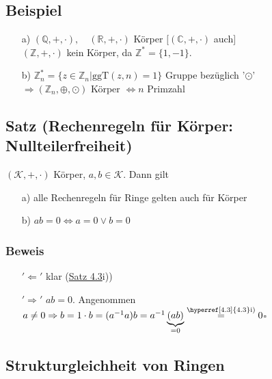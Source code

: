 \documentclass[12pt,titlepage, pdf]{article}
\newcommand{\qed}{\hfill$\square$}
\renewcommand{\>}{\rightarrow}
\renewcommand{\*}{\cdot}
\begin{document}
	      \subsection{Beispiel}
	      \begin{itemize}
	      	\item[a)] $(\mathds{Q},+,\cdot),\quad (\mathds{R},+,\cdot)$ Körper $[(\mathds{C},+,\cdot)$ auch] \\
	      	      $(\mathds{Z},+,\cdot)$ kein Körper, da $\mathds{Z}^* = \{1,-1\}$.
	      	\item[b)] $\mathds{Z}_n^* = \{z \in \mathds{Z}_n| \text{ggT}(z,n) = 1\}$ Gruppe bezüglich '$\odot$'\\
	      	      $\Rightarrow (\mathds{Z}_n, \oplus, \odot)$ Körper $\Leftrightarrow n$ Primzahl
	      \end{itemize}
	      	
	      \subsection{Satz (Rechenregeln für Körper: Nullteilerfreiheit)}
	      \label{4.7}	
	      $(\mathcal{K},+,\cdot)$ Körper, $a,b \in \mathcal{K}$. Dann gilt
	      \begin{itemize}
	      	\item[a)] alle Rechenregeln für Ringe gelten auch für Körper
	      	\item[b)] $ab = 0 \Leftrightarrow a = 0\vee b = 0$ \qquad [Gegenbeispiel: $(\mathds{Z}_6, \oplus, \odot)$, weil $2 \odot 3 = 0$]
	      \end{itemize}
	      \subsubsection*{Beweis}
	      \begin{itemize}
	      	\item[$'\Leftarrow'$] klar (\hyperref[4.3]{Satz 4.3}i))
	      	\item[$'\Rightarrow'$] $ab = 0$. Angenommen $a \neq 0 \Rightarrow b=1 \cdot b = (a^{-1}a)b = a^{-1}\underbrace{(ab)}_{= 0} \overset{\textrm{\hyperref[4.3]{4.3}i)}}{=} 0$\qed
	      \end{itemize}
	      	
	      \subsection*{Strukturgleichheit von Ringen}
\end{document}
